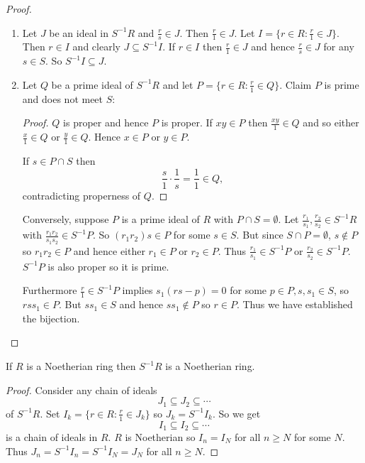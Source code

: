 \documentclass[a4paper]{article}
\begin{document}
\begin{proof}\leavevmode
  \begin{enumerate}
  \item Let \(J\) be an ideal in \(S^{-1}R\) and \(\frac{r}{s} \in J\). Then \(\frac{r}{1} \in J\). Let \(I = \{r \in R: \frac{r}{1} \in J\}\). Then \(r \in I\) and clearly \(J \subseteq S^{-1}I\). If \(r \in I\) then \(\frac{r}{1} \in J\) and hence \(\frac{r}{s} \in J\) for any \(s \in S\). So \(S^{-1}I \subseteq J\).
  \item Let \(Q\) be a prime ideal of \(S^{-1}R\) and let \(P = \{r \in R: \frac{r}{1} \in Q\}\). Claim \(P\) is prime and does not meet \(S\):
    \begin{proof}
      \(Q\) is proper and hence \(P\) is proper. If \(xy \in P\) then \(\frac{xy}{1} \in Q\) and so either \(\frac{x}{1} \in Q\) or \(\frac{y}{1} \in Q\). Hence \(x \in P\) or \(y \in P\).

      If \(s \in P \cap S\) then
      \[
        \frac{s}{1} \cdot \frac{1}{s} = \frac{1}{1} \in Q,
      \]
      contradicting properness of \(Q\).
    \end{proof}

    Conversely, suppose \(P\) is a prime ideal of \(R\) with \(P \cap S = \emptyset\). Let \(\frac{r_1}{s_1}, \frac{r_2}{s_2} \in S^{-1}R\) with \(\frac{r_1r_2}{s_1s_2} \in S^{-1}P\). So \((r_1r_2)s \in P\) for some \(s \in S\). But since \(S \cap P = \emptyset\), \(s \notin P\) so \(r_1r_2 \in P\) and hence either \(r_1 \in P\) or \(r_2 \in P\). Thus \(\frac{r_1}{s_1} \in S^{-1}P\) or \(\frac{r_2}{s_2} \in S^{-1}P\). \(S^{-1}P\) is also proper so it is prime.

    Furthermore \(\frac{r}{1} \in S^{-1}P\) implies \(s_1(rs - p) = 0\) for some \(p \in P, s, s_1 \in S\), so \(rss_1 \in P\). But \(ss_1 \in S\) and hence \(ss_1 \notin P\) so \(r \in P\). Thus we have established the bijection.
  \end{enumerate}
\end{proof}

\begin{lemma}
  If \(R\) is a Noetherian ring then \(S^{-1}R\) is a Noetherian ring.
\end{lemma}

\begin{proof}
  Consider any chain of ideals
  \[
    J_1 \subseteq J_2 \subseteq \cdots
  \]
  of \(S^{-1}R\). Set \(I_k = \{r \in R: \frac{r}{1} \in J_k\}\) so \(J_k = S^{-1}I_k\). So we get
  \[
    I_1 \subseteq I_2 \subseteq \cdots
  \]
  is a chain of ideals in \(R\). \(R\) is Noetherian so \(I_n = I_N\) for all \(n \geq N\) for some \(N\). Thus \(J_n = S^{-1}I_n = S^{-1}I_N = J_N\) for all \(n \geq N\).
\end{proof}
\end{document}
